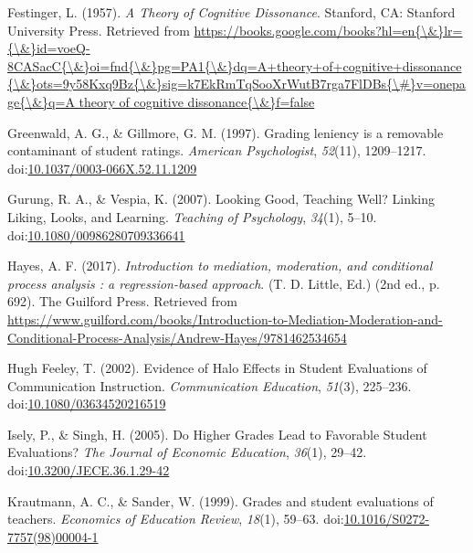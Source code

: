 \documentclass[,man]{apa6}
\theoremstyle{definition}
\theoremstyle{definition}
\theoremstyle{definition}
\theoremstyle{remark}
\begin{document}
\hypertarget{ref-Festinger1957}{}
Festinger, L. (1957). \emph{A Theory of Cognitive Dissonance}. Stanford,
CA: Stanford University Press. Retrieved from
\href{https://books.google.com/books?hl=en\%7B/\&\%7Dlr=\%7B/\&\%7Did=voeQ-8CASacC\%7B/\&\%7Doi=fnd\%7B/\&\%7Dpg=PA1\%7B/\&\%7Ddq=A+theory+of+cognitive+dissonance\%7B/\&\%7Dots=9y58Kxq9Bz\%7B/\&\%7Dsig=k7EkRmTqSooXrWutB7rga7FlDBs\%7B/\#\%7Dv=onepage\%7B/\&\%7Dq=A\%20theory\%20of\%20cognitive\%20dissonance\%7B/\&\%7Df=false}{https://books.google.com/books?hl=en\{\textbackslash{}\&\}lr=\{\textbackslash{}\&\}id=voeQ-8CASacC\{\textbackslash{}\&\}oi=fnd\{\textbackslash{}\&\}pg=PA1\{\textbackslash{}\&\}dq=A+theory+of+cognitive+dissonance\{\textbackslash{}\&\}ots=9y58Kxq9Bz\{\textbackslash{}\&\}sig=k7EkRmTqSooXrWutB7rga7FlDBs\{\textbackslash{}\#\}v=onepage\{\textbackslash{}\&\}q=A theory of cognitive dissonance\{\textbackslash{}\&\}f=false}

\hypertarget{ref-Greenwald1997}{}
Greenwald, A. G., \& Gillmore, G. M. (1997). Grading leniency is a
removable contaminant of student ratings. \emph{American Psychologist},
\emph{52}(11), 1209--1217.
doi:\href{https://doi.org/10.1037/0003-066X.52.11.1209}{10.1037/0003-066X.52.11.1209}

\hypertarget{ref-Gurung2007}{}
Gurung, R. A., \& Vespia, K. (2007). Looking Good, Teaching Well?
Linking Liking, Looks, and Learning. \emph{Teaching of Psychology},
\emph{34}(1), 5--10.
doi:\href{https://doi.org/10.1080/00986280709336641}{10.1080/00986280709336641}

\hypertarget{ref-Hayes2017}{}
Hayes, A. F. (2017). \emph{Introduction to mediation, moderation, and
conditional process analysis : a regression-based approach}. (T. D.
Little, Ed.) (2nd ed., p. 692). The Guilford Press. Retrieved from
\url{https://www.guilford.com/books/Introduction-to-Mediation-Moderation-and-Conditional-Process-Analysis/Andrew-Hayes/9781462534654}

\hypertarget{ref-HughFeeley2002}{}
Hugh Feeley, T. (2002). Evidence of Halo Effects in Student Evaluations
of Communication Instruction. \emph{Communication Education},
\emph{51}(3), 225--236.
doi:\href{https://doi.org/10.1080/03634520216519}{10.1080/03634520216519}

\hypertarget{ref-Isely2005}{}
Isely, P., \& Singh, H. (2005). Do Higher Grades Lead to Favorable
Student Evaluations? \emph{The Journal of Economic Education},
\emph{36}(1), 29--42.
doi:\href{https://doi.org/10.3200/JECE.36.1.29-42}{10.3200/JECE.36.1.29-42}

\hypertarget{ref-Krautmann1999}{}
Krautmann, A. C., \& Sander, W. (1999). Grades and student evaluations
of teachers. \emph{Economics of Education Review}, \emph{18}(1), 59--63.
doi:\href{https://doi.org/10.1016/S0272-7757(98)00004-1}{10.1016/S0272-7757(98)00004-1}
\end{document}
